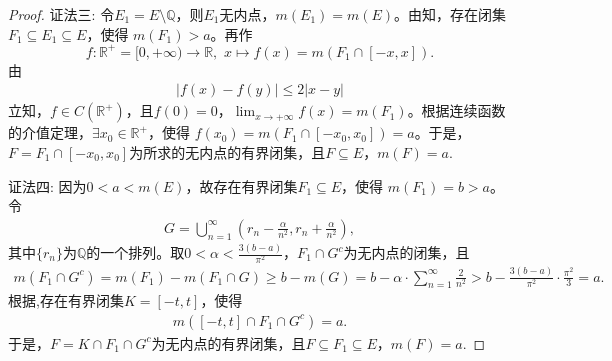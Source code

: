 \documentclass[../../main.tex]{subfiles}%
\begin{document}
\begin{proof}
{\color{blue}证法三:} 令$E_1=E\setminus\mathbb{Q}$，则$E_1$无内点，$m(E_1)=m(E)$。由知，存在闭集$F_1\subseteq E_1\subseteq E$，使得 $m(F_1)>a$。再作
$$
f:\mathbb{R}^+=[0,+\infty)\to\mathbb{R},\,\,x\mapsto f(x)=m(F_1\cap[-x,x]).
$$
由
\begin{align*}
|f(x)-f(y)| \leqslant 2|x-y|
\end{align*}
立知，$f\in C(\mathbb{R}^+)$，且$f(0)=0$，$\lim_{x\to+\infty} f(x)=m(F_1)$。根据连续函数的介值定理，$\exists x_0\in\mathbb{R}^+$，使得 $f(x_0)=m(F_1\cap[-x_0,x_0])=a$。于是，$F=F_1\cap[-x_0,x_0]$为所求的无内点的有界闭集，且$F\subseteq E$，$m(F)=a$.

{\color{blue}证法四:} 因为$0<a<m(E)$，故存在有界闭集$F_1\subseteq E$，使得 $m(F_1)=b>a$。令
\begin{align*}
G = \bigcup\limits_{n=1}^{\infty} \left(r_n - \frac{\alpha}{n^2}, r_n + \frac{\alpha}{n^2}\right),
\end{align*}
其中$\{r_n\}$为$\mathbb{Q}$的一个排列。取$0<\alpha<\frac{3(b-a)}{\pi^2}$，$F_1\cap G^c$为无内点的闭集，且
\begin{align*}
m(F_1\cap G^c) = m(F_1) - m(F_1\cap G) 
\geqslant b - m(G) = b - \alpha \cdot \sum\limits_{n=1}^{\infty} \frac{2}{n^2} 
> b - \frac{3(b-a)}{\pi^2} \cdot \frac{\pi^2}{3} = a.
\end{align*}
根据,存在有界闭集$K=[-t,t]$，使得
\begin{align*}
m([-t,t]\cap F_1\cap G^c) = a.
\end{align*}
于是，$F=K\cap F_1\cap G^c$为无内点的有界闭集，且$F\subseteq F_1\subseteq E$，$m(F)=a$.
\end{proof}
\end{document}
